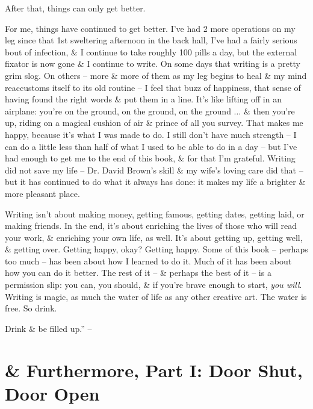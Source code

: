 \documentclass{article}
\numberwithin{equation}{section}
\begin{document}
After that, things can only get better.

 For me, things have continued to get better. I've had 2 more operations on my leg since that 1st sweltering afternoon in the back hall, I've had a fairly serious bout of infection, \& I continue to take roughly 100 pills a day, but the external fixator is now gone \& I continue to write. On some days that writing is a pretty grim slog. On others -- more \& more of them as my leg begins to heal \& my mind reaccustoms itself to its old routine -- I feel that buzz of happiness, that sense of having found the right words \& put them in a line. It's like lifting off in an airplane: you're on the ground, on the ground, on the ground $\ldots$ \& then you're up, riding on a magical cushion of air \& prince of all you survey. That makes me happy, because it's what I was made to do. I still don't have much strength -- I can do a little less than half of what I used to be able to do in a day -- but I've had enough to get me to the end of this book, \& for that I'm grateful. Writing did not save my life -- Dr. David Brown's skill \& my wife's loving care did that -- but it has continued to do what it always has done: it makes my life a brighter \& more pleasant place.

Writing isn't about making money, getting famous, getting dates, getting laid, or making friends. In the end, it's about enriching the lives of those who will read your work, \& enriching your own life, as well. It's about getting up, getting well, \& getting over. Getting happy, okay? Getting happy. Some of this book -- perhaps too much -- has been about how I learned to do it. Much of it has been about how you can do it better. The rest of it -- \& perhaps the best of it -- is a permission slip: you can, you should, \& if you're brave enough to start, \textit{you will}. Writing is magic, as much the water of life as any other creative art. The water is free. So drink.

Drink \& be filled up.'' -- \cite[pp. 204--217]{King2010}


\section{\& Furthermore, Part I: Door Shut, Door Open}

\end{document}
